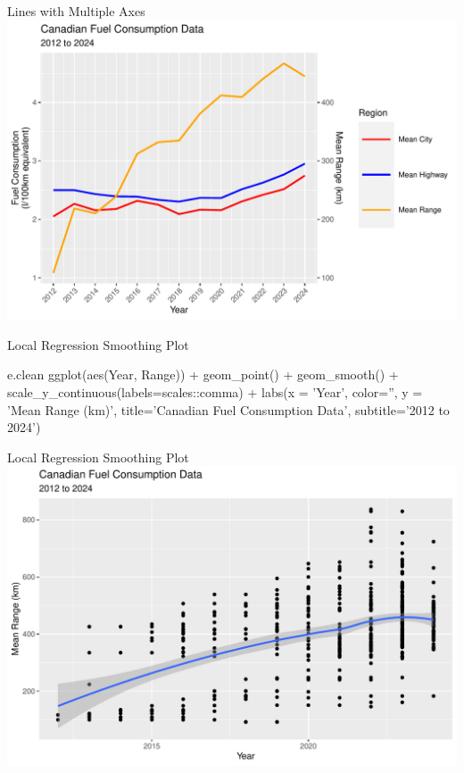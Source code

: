 \documentclass[ignorenonframetext,xcolor=x11names]{beamer}
\begin{document}
\begin{frame}{Lines with Multiple Axes}
  \includegraphics[width=\textwidth]{fuel.linesTwoScales.pdf}
\end{frame}

\begin{frame}[fragile]{Local Regression Smoothing Plot}
\footnotesize
\begin{Rcode}
e.clean %
  ggplot(aes(Year, Range)) +
    geom_point() +
    geom_smooth() +
    scale_y_continuous(labels=scales::comma) + 
    labs(x = 'Year', color='', y = 'Mean Range (km)', 
         title='Canadian Fuel Consumption Data', 
         subtitle='2012 to 2024')
\end{Rcode}
\end{frame}

\begin{frame}{Local Regression Smoothing Plot}
  \includegraphics[width=\textwidth]{fuel.linesSmooth.pdf}
\end{frame}
\end{document}
